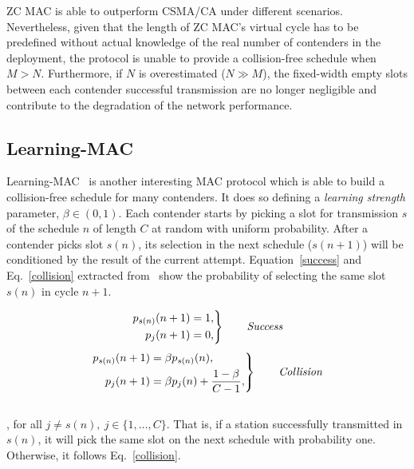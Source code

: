\documentclass[a4paper,journal]{IEEEtran}
\begin{document}
ZC MAC is able to outperform CSMA/CA under different scenarios. Nevertheless, given that the length of ZC MAC's virtual cycle has to be predefined without actual knowledge of the real number of contenders in the deployment, the protocol is unable to provide a collision-free schedule when $M>N$. Furthermore, if $N$ is overestimated ($N\gg M$), the fixed-width empty slots between each contender successful transmission are no longer negligible and contribute to the degradation of the network performance.


\subsection{Learning-MAC}

Learning-MAC~\cite{L_MAC} is another interesting MAC protocol which is able to build a collision-free schedule for many contenders. It does so defining a \emph{learning strength} parameter, $\beta\in(0,1)$. Each contender starts by picking a slot for transmission $s$ of the schedule $n$ of length $C$ at random with uniform probability. After a contender picks slot $s(n)$, its selection in the next schedule ($s(n+1)$) will be conditioned by the result of the current attempt. Equation~\ref{success} and Eq.~\ref{collision} extracted from~\cite{L_MAC} show the probability of selecting the same slot $s(n)$ in cycle $n+1$.

\begin{equation} \label{success}
		\left. \begin{aligned}
			p_{s(n)}(n+1)&=1,\\
			p_{j}(n+1)&=0,
		\end{aligned}
	\right\}
	\qquad \text{\emph{Success}}
\end{equation}
\begin{equation} \label{collision}
	\left. \begin{aligned}
			p_{s(n)}(n+1)&=\beta p_{s(n)}(n),\\
			p_{j}(n+1)&=\beta p_{j}(n)+\frac{1-\beta}{C -1},
		\end{aligned}
	\right\}
	\qquad \text{\emph{Collision}}
\end{equation}
\\
, for all $j\neq s(n),~j\in \{1,\dots ,C\}$. That is, if a station successfully transmitted in $s(n)$, it will pick the same slot on the next schedule with probability one. Otherwise, it follows Eq.~\ref{collision}.
\end{document}
